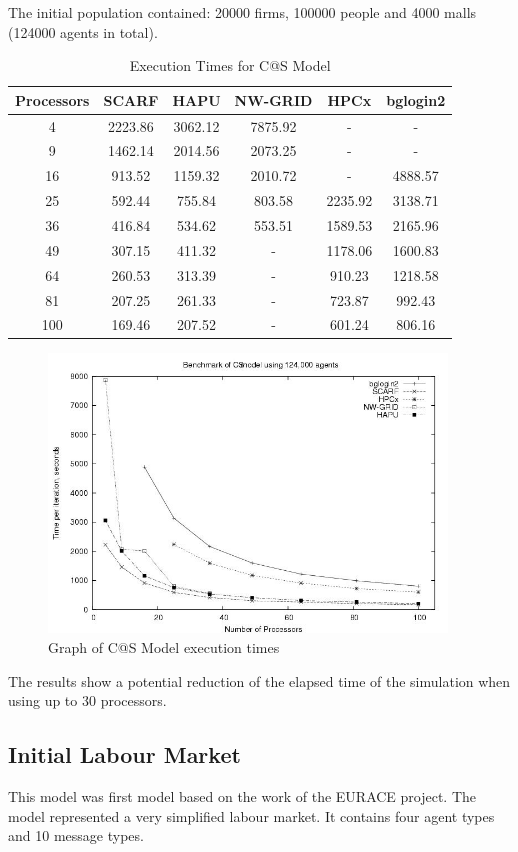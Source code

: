 The initial population contained: 20000 firms, 100000 people and 4000 malls (124000 agents in total).
{
\renewcommand{\arraystretch}{1.25}
\begin{table}[ht]
 \centering
  \begin{tabular}{c|ccccc}
 Processors &SCARF &HAPU  &NW-GRID &HPCx  &bglogin2 \\ \hline
4 &2223.86 &3062.12 &7875.92 &- &-      \\
9 &1462.14 &2014.56 &2073.25 &- &-      \\
16 &913.52 &1159.32 &2010.72 &- &4888.57        \\
25 &592.44 &755.84 &803.58 &2235.92 &3138.71    \\
36 &416.84 &534.62 &553.51 &1589.53 &2165.96    \\
49 &307.15 &411.32 &- &1178.06 &1600.83 \\
64 &260.53 &313.39 &- &910.23 &1218.58  \\
81 &207.25 &261.33 &- &723.87 &992.43   \\
100 &169.46 &207.52 &- &601.24 &806.16  \\

 \end{tabular}
 \caption{Execution Times for C@S Model}
 \label{tab:ExecutionTimesForC@S}
\end{table}
}
\bigskip
\begin{figure}[ht]
 \centering
  \includegraphics[width=300pt]{C@S2-graph.jpg}
 \caption{Graph of C@S Model execution times}
 \label{fig:C@S-graph}
\end{figure}
The results show a potential reduction of the elapsed time of the simulation when using up to 30 processors.



\subsection{Initial Labour Market}
This model was first model based on the work of the EURACE project. The model represented a very simplified labour market. It contains four agent types and 10 message types.

